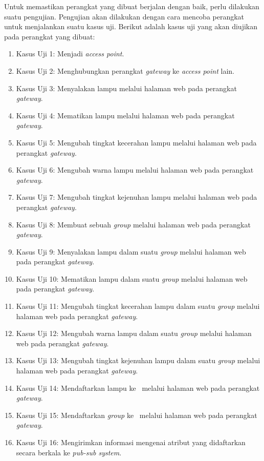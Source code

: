 Untuk memastikan perangkat yang dibuat berjalan dengan baik, perlu dilakukan suatu pengujian. Pengujian akan dilakukan dengan cara mencoba perangkat untuk menjalankan suatu kasus uji. Berikut adalah kasus uji yang akan diujikan pada perangkat yang dibuat:
\begin{enumerate}
	\item Kasus Uji 1: Menjadi \textit{access point}.
	\item Kasus Uji 2: Menghubungkan perangkat \textit{gateway} ke \textit{access point} lain.
	\item Kasus Uji 3: Menyalakan lampu melalui halaman web pada perangkat \textit{gateway}.
	\item Kasus Uji 4: Mematikan lampu melalui halaman web pada perangkat \textit{gateway}.
	\item Kasus Uji 5: Mengubah tingkat kecerahan lampu melalui halaman web pada perangkat \textit{gateway}.
	\item Kasus Uji 6: Mengubah warna lampu melalui halaman web pada perangkat \textit{gateway}.
	\item Kasus Uji 7: Mengubah tingkat kejenuhan lampu melalui halaman web pada perangkat \textit{gateway}.
	\item Kasus Uji 8: Membuat sebuah \textit{group} melalui halaman web pada perangkat \textit{gateway}.
	\item Kasus Uji 9: Menyalakan lampu dalam suatu \textit{group} melalui halaman web pada perangkat \textit{gateway}.
	\item Kasus Uji 10: Mematikan lampu dalam suatu \textit{group} melalui halaman web pada perangkat \textit{gateway}.
	\item Kasus Uji 11: Mengubah tingkat kecerahan lampu dalam suatu \textit{group} melalui halaman web pada perangkat \textit{gateway}.
	\item Kasus Uji 12: Mengubah warna lampu dalam suatu \textit{group} melalui halaman web pada perangkat \textit{gateway}.
	\item Kasus Uji 13: Mengubah tingkat kejenuhan lampu dalam suatu \textit{group} melalui halaman web pada perangkat \textit{gateway}.
	\item Kasus Uji 14: Mendaftarkan lampu ke \plat~melalui halaman web pada perangkat \textit{gateway}.
	\item Kasus Uji 15: Mendaftarkan \textit{group} ke \plat~melalui halaman web pada perangkat \textit{gateway}.
	\item Kasus Uji 16: Mengirimkan informasi mengenai atribut yang didaftarkan secara berkala ke \textit{pub-sub system}.

\end{enumerate}
